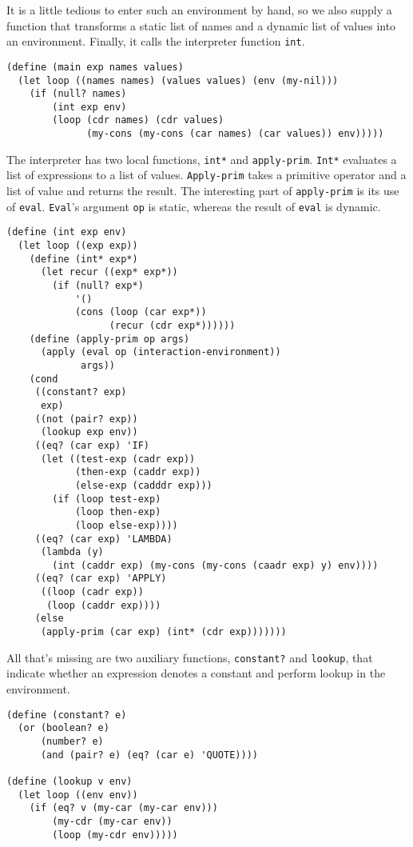 \documentclass[11pt]{article}
\begin{document}
It is a little tedious to enter such an environment by hand, so we
also supply a function that transforms a static list of names and a
dynamic list of values into an environment. Finally, it calls the
interpreter function \texttt{int}.
\begin{small}
\begin{verbatim}
(define (main exp names values)
  (let loop ((names names) (values values) (env (my-nil)))
    (if (null? names)
        (int exp env)
        (loop (cdr names) (cdr values)
              (my-cons (my-cons (car names) (car values)) env)))))
\end{verbatim}
\end{small}
The interpreter has two local functions, \texttt{int*} and
\texttt{apply-prim}. \texttt{Int*} evaluates a
list of expressions to a list of values. \texttt{Apply-prim} takes a
primitive operator and a list of value and returns the result. The
interesting part of \texttt{apply-prim} is its use of
\texttt{eval}. \texttt{Eval}'s argument
\texttt{op} is static, whereas the result of \texttt{eval} is
dynamic. 
\begin{small}
\begin{verbatim}
(define (int exp env)
  (let loop ((exp exp))
    (define (int* exp*)
      (let recur ((exp* exp*))
        (if (null? exp*)
            '()
            (cons (loop (car exp*))
                  (recur (cdr exp*))))))
    (define (apply-prim op args)
      (apply (eval op (interaction-environment))
             args))
    (cond
     ((constant? exp)
      exp)
     ((not (pair? exp))
      (lookup exp env))
     ((eq? (car exp) 'IF)
      (let ((test-exp (cadr exp))
            (then-exp (caddr exp))
            (else-exp (cadddr exp)))
        (if (loop test-exp)
            (loop then-exp)
            (loop else-exp))))
     ((eq? (car exp) 'LAMBDA)
      (lambda (y)
        (int (caddr exp) (my-cons (my-cons (caadr exp) y) env))))
     ((eq? (car exp) 'APPLY)
      ((loop (cadr exp))
       (loop (caddr exp))))
     (else
      (apply-prim (car exp) (int* (cdr exp)))))))
\end{verbatim}
\end{small}
All that's missing are two auxiliary functions, \texttt{constant?} and
\texttt{lookup}, that indicate whether an expression denotes a
constant and perform lookup in the environment.
\begin{small}
\begin{verbatim}
(define (constant? e)
  (or (boolean? e)
      (number? e)
      (and (pair? e) (eq? (car e) 'QUOTE))))

(define (lookup v env)
  (let loop ((env env))
    (if (eq? v (my-car (my-car env)))
        (my-cdr (my-car env))
        (loop (my-cdr env)))))
\end{verbatim}
\end{small}
\end{document}
